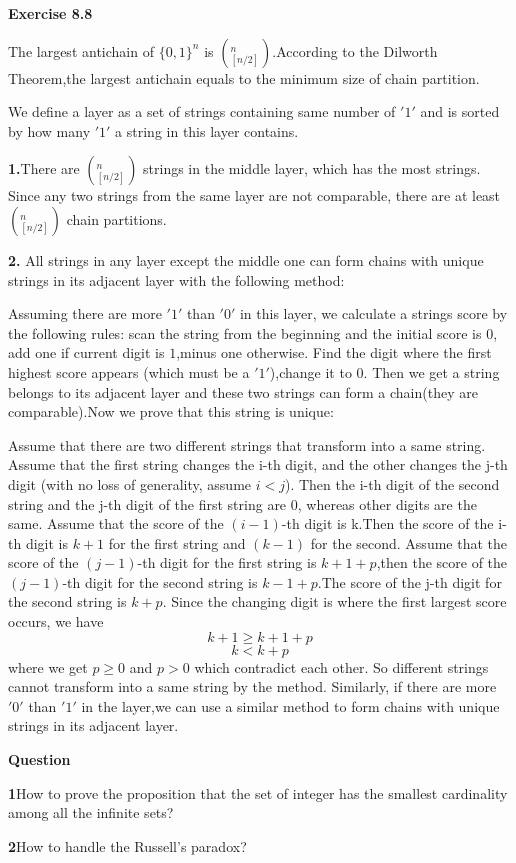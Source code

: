 \documentclass{article} %
\begin{document}
	\textbf{Exercise 8.8}\par
	 The largest antichain of $\{0,1\}^n$ is $(_{[n/2]}^n)$.According to the Dilworth Theorem,the largest antichain equals to the minimum size of chain partition.\par
	 We define a layer as a set of strings containing same number of $'1'$ and is sorted by how many  $'1'$ a string in this layer contains.\par
	 \textbf{1.}There are $(_{[n/2]}^n)$ strings in the middle layer, which has the most strings. Since any two strings from the same layer are not comparable, there are at least $(_{[n/2]}^n)$ chain partitions.\par
	 \textbf{2.} All strings in any layer except the middle one can form chains with unique strings in its adjacent layer with the following method:\par
	 Assuming there are more $'1'$ than $'0'$ in this layer, we calculate a strings score by the following rules: scan the string from the beginning and the initial score is $0$, add one if current digit is $1$,minus one otherwise. Find the digit where the first highest score appears (which must be a $'1'$),change it to $0$. Then we get a string belongs to its adjacent layer and these two strings can form a chain(they are comparable).Now we prove that this string is unique:\par
	 Assume that there are two different strings that transform into a same string. Assume that the first string changes the i-th digit, and the other changes the j-th digit (with no loss of generality, assume $i<j$).  Then the i-th digit of the second string and the j-th digit of the first string are $0$, whereas other digits are the same. Assume that the score of the $(i-1)$-th digit is k.Then the score of the i-th digit is $k+1$ for the first string and $(k-1)$ for the second. Assume that the score of the $(j-1)$-th digit for the first string is $k+1+p$,then the score of the $(j-1)$-th digit for the second string is $k-1+p$.The score of the j-th digit for the second string is $k+p$. Since the changing digit is where the first largest score occurs, we have
	 $$
	 k+1 \ge k+1+p
	 $$
	 $$
	 k<k+p
	 $$
	 where we get $p\geq 0$ and $p>0$ which contradict each other. So  different strings cannot transform into a same string by the method. Similarly, if there are more $'0'$ than $'1'$ in the layer,we can use a similar method to form chains with unique strings in its adjacent layer.
	
	\textbf{Question}\par
	\textbf{1}How to prove the proposition that the set of integer has the smallest cardinality among all the infinite sets?\par
	\textbf{2}How to handle the Russell's paradox?
	
\end{document}
